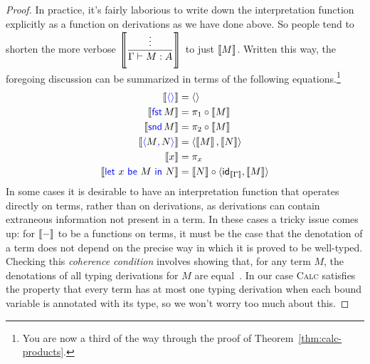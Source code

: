 \begin{proof}
  In practice, it's fairly laborious to write down
  the interpretation function explicitly as a function
  on derivations as we have done above.
  So people tend to shorten the more verbose
  \(\left\llbracket \dfrac{\vdots}{\Gamma\vdash M : A}\right\rrbracket\)
  to just
  \(\left\llbracket M\right\rrbracket\). Written this way, the foregoing discussion
  can be summarized in terms of the following
  equations.\footnote{%
    You are now a third of the way through
  the proof of Theorem~\ref{thm:calc-products}.}
  \begin{align*}
    \llbr{\plunit} &= \angled{} \\
    \llbr{\plfst{M}} &= \pi_1 \circ \llbr{M} \\
    \llbr{\plsnd{M}} &= \pi_2 \circ \llbr{M} \\
    \llbr{\plpair{M}{N}} &= \angled{\llbr{M},\llbr{N}} \\
    \llbr{x} &= \pi_x \\
    \llbr{\pllet{x}{M}{N}} &=
      \llbr{N} \circ \angled{\idt_{\llbr{\Gamma}},\llbr{M}}
  \end{align*}
  In some cases it is desirable
  to have an interpretation function that operates
  directly on terms,
  rather than on derivations,
  as derivations can contain extraneous information
  not present in a term.
  In these cases a tricky issue comes up:
  for \(\left\llbracket -\right\rrbracket\) to be a functions on terms,
  it must be the case that
  the denotation of a term does not depend on
  the precise way in which it is proved to be well-typed.
  Checking this \emph{coherence condition}
  involves showing that, for any term \(M\),
  the denotations of all typing derivations
  for \(M\) are equal~\citep{reynolds1991coherence}.
  In our case \textsc{Calc} satisfies the property that every term has at most one typing derivation
  when each bound variable is annotated with its type,
  so we won't worry too much about this.


\end{proof}
